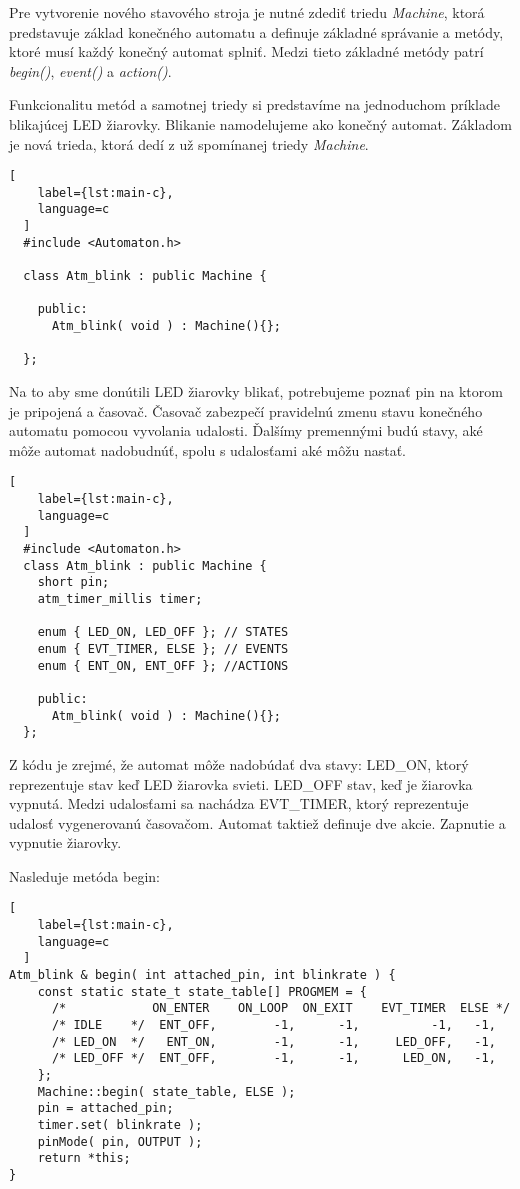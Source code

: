 \noindent \par Pre vytvorenie nového stavového stroja je nutné zdediť triedu \textit{Machine}, ktorá predstavuje základ konečného automatu a definuje základné správanie a metódy, ktoré musí každý konečný automat splniť. Medzi tieto základné metódy patrí \textit{begin()}, \textit{event()} a \textit{action()}. 
\par Funkcionalitu metód a samotnej triedy si predstavíme na jednoduchom príklade blikajúcej LED žiarovky. Blikanie namodelujeme ako konečný automat. Základom je nová trieda, ktorá dedí z už spomínanej triedy \textit{Machine}.
\begin{lstlisting}[
    label={lst:main-c},
    language=c
  ]
  #include <Automaton.h>

  class Atm_blink : public Machine {
  
    public:
      Atm_blink( void ) : Machine(){};
  
  };
\end{lstlisting}

Na to aby sme donútili LED žiarovky blikať, potrebujeme poznať pin na ktorom je 
pripojená a časovač. Časovač zabezpečí pravidelnú zmenu stavu konečného automatu pomocou vyvolania udalosti. Ďalšímy premennými budú stavy, aké môže automat nadobudnúť, spolu s udalosťami aké môžu nastať.

\begin{lstlisting}[
    label={lst:main-c},
    language=c
  ]
  #include <Automaton.h>
  class Atm_blink : public Machine { 
    short pin;
    atm_timer_millis timer;

    enum { LED_ON, LED_OFF }; // STATES
    enum { EVT_TIMER, ELSE }; // EVENTS
    enum { ENT_ON, ENT_OFF }; //ACTIONS

    public:
      Atm_blink( void ) : Machine(){};  
  };
\end{lstlisting}
Z kódu je zrejmé, že automat môže nadobúdať dva stavy: LED\_ON, ktorý reprezentuje stav keď LED žiarovka svieti. LED\_OFF stav, keď je žiarovka vypnutá. Medzi udalosťami sa nachádza EVT\_TIMER, ktorý reprezentuje udalosť vygenerovanú časovačom. Automat taktiež definuje dve akcie. Zapnutie a vypnutie žiarovky.
\par Nasleduje metóda begin:
\begin{lstlisting}[
    label={lst:main-c},
    language=c
  ]
Atm_blink & begin( int attached_pin, int blinkrate ) {
    const static state_t state_table[] PROGMEM = {
      /*            ON_ENTER    ON_LOOP  ON_EXIT    EVT_TIMER  ELSE */
      /* IDLE    */  ENT_OFF,        -1,      -1,          -1,   -1,
      /* LED_ON  */   ENT_ON,        -1,      -1,     LED_OFF,   -1,
      /* LED_OFF */  ENT_OFF,        -1,      -1,      LED_ON,   -1,
    };
    Machine::begin( state_table, ELSE );
    pin = attached_pin; 
    timer.set( blinkrate ); 
    pinMode( pin, OUTPUT ); 
    return *this;          
}
\end{lstlisting}

